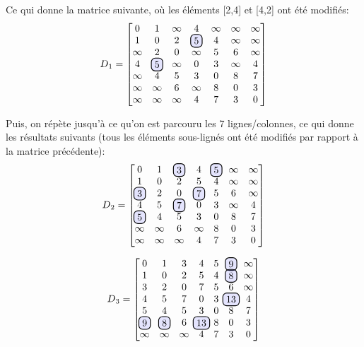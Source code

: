\documentclass[devoir3.tex]{subfiles}
\begin{document}
Ce qui donne la matrice suivante, où les éléments [2,4] et [4,2] ont été modifiés:
\begin{align*}
	D\textsubscript{1} =
	\begin{bmatrix}
		0 	& 1 	  	& \infty 	& 4 	  	  & \infty 	& \infty & \infty \\
		1 	& 0 		& 2		& \hlight{5}	  & 4		& \infty & \infty \\
		\infty  & 2 		& 0 		& \infty 	  & 5 	  	& 6 	  & \infty \\
		4 	& \hlight{5}	& \infty   	& 0 	  	  & 3	  	& \infty & 4 \\
		\infty  & 4 	 	& 5 		& 3 	  	  & 0 	  	& 8 	  & 7 \\
		\infty  & \infty 	& 6		& \infty 	  & 8 	  	& 0 	  & 3 \\
		\infty 	& \infty 	& \infty 	& 4 	  	  & 7 	  	& 3 	 & 0
	\end{bmatrix}
\end{align*}

Puis, on répète jusqu'à ce qu'on est parcouru les 7 lignes/colonnes, ce qui donne les résultats suivants (tous les éléments sous-lignés ont été modifiés par rapport à la matrice précédente):
\begin{align*}
	D\textsubscript{2} =
	\begin{bmatrix}
		0 		& 1 	  	& \hlight{3} 	& 4 	  	  & \hlight{5}	& \infty & \infty \\
		1 		& 0 		& 2		& 5		  & 4		& \infty & \infty \\
		\hlight{3} 	& 2 		& 0 		& \hlight{7} 	  & 5 	  	& 6 	  & \infty \\
		4 		& 5		& \hlight{7}  	& 0 	  	  & 3	  	& \infty & 4 \\
		\hlight{5}  	& 4 	 	& 5 		& 3 	  	  & 0 	  	& 8 	  & 7 \\
		\infty  	& \infty 	& 6		& \infty 	  & 8 	  	& 0 	  & 3 \\
		\infty 		& \infty 	& \infty 	& 4 	  	  & 7 	  	& 3 	  & 0
	\end{bmatrix}
\end{align*}

\begin{align*}
	D\textsubscript{3} =
	\begin{bmatrix}
		0 		& 1 	  	& 3 		& 4 	  	  & 5		& \hlight{9} 	& \infty \\
		1 		& 0 		& 2		& 5		  & 4		& \hlight{8} 	& \infty \\
		3	 	& 2 		& 0 		& 7	 	  & 5 	  	& 6 		& \infty \\
		4 		& 5		& 7	  	& 0 	  	  & 3	  	& \hlight{13}	& 4 \\
		5  		& 4 	 	& 5 		& 3 	  	  & 0 	  	& 8 	 	& 7 \\
		\hlight{9}  	& \hlight{8} 	& 6		& \hlight{13}	  & 8 	  	& 0 	 	& 3 \\
		\infty 		& \infty 	& \infty 	& 4 	  	  & 7 	  	& 3 	 	& 0
	\end{bmatrix}
\end{align*}
\end{document}
